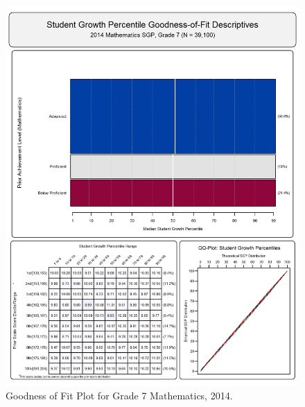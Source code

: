 \documentclass[12pt]{article}
\begin{document}
\begin{figure}[htbp]
\centering
\includegraphics{../img/Goodness_of_Fit/MATHEMATICS.2014/2014_MATH_7;2013_MATH_6;2012_MATH_5;2011_MATH_4;2010_MATH_3.png}
\caption{Goodness of Fit Plot for Grade 7 Mathematics, 2014.}
\end{figure}
\end{document}
